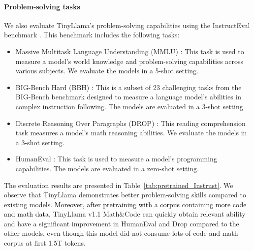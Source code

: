 \documentclass{article}
\begin{document}
\paragraph{Problem-solving tasks}
We also evaluate TinyLlama's problem-solving capabilities using the InstructEval benchmark \citep{DBLP:journals/corr/abs-2306-04757}. This benchmark includes the following tasks:

\begin{itemize}
\item Massive Multitask Language Understanding (MMLU) \citep{hendrycks2020mmlu}: This task is used to measure a model's world knowledge and problem-solving capabilities across various subjects. We evaluate the models in a 5-shot setting.
\item BIG-Bench Hard (BBH) \citep{suzgun2022challenging}: This is a subset of 23 challenging tasks from the BIG-Bench benchmark \citep{srivastava2022beyond} designed to measure a language model's abilities in complex instruction following. The models are evaluated in a 3-shot setting.
\item Discrete Reasoning Over Paragraphs (DROP) \citep{dua2019drop}: This reading comprehension task measures a model's math reasoning abilities. We evaluate the models in a 3-shot setting.
\item HumanEval \citep{DBLP:conf/kdd/ZhengXZDWXSW0LS23}: This task is used to measure a model's programming capabilities. The models are evaluated in a zero-shot setting.
\end{itemize}

The evaluation results are presented in Table~\ref{tab:pretrained_Instrust}.
We observe that TinyLlama demonstrates better problem-solving skills compared to existing models.
\textcolor{black}{Moreover, after pretraining with a corpus containing more code and math data}, TinyLlama v1.1 Math\&Code can quickly obtain relevant ability and have a significant improvement in HumanEval and Drop compared to the other models, even though this model did not consume lots of code and math corpus at first 1.5T tokens.
\end{document}

